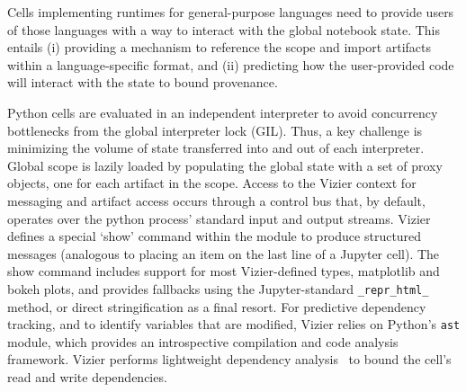 Cells implementing runtimes for general-purpose languages need to provide users of those languages with a way to interact with the global notebook state.
This entails (i) providing a mechanism to reference the scope and import artifacts within a language-specific format, and (ii) predicting how the user-provided code will interact with the state to bound provenance.

%
Python cells are evaluated in an independent interpreter to avoid concurrency bottlenecks from the global interpreter lock (GIL).
Thus, a key challenge is minimizing the volume of state transferred into and out of each interpreter.
Global scope is lazily loaded by populating the global state with a set of proxy objects, one for each artifact in the scope. %
%
%
Access to the Vizier context for messaging and artifact access occurs through a control bus that, by default, operates over the python process' standard input and output streams.
Vizier defines a special `show' command within the module to produce structured messages (analogous to placing an item on the last line of a Jupyter cell).
The show command includes support for most Vizier-defined types, matplotlib and bokeh plots, and provides fallbacks using the Jupyter-standard \texttt{\_repr\_html\_} method, or direct stringification as a final resort.
%
For predictive dependency tracking, and to identify variables that are modified, Vizier relies on Python's \texttt{ast} module, which provides an introspective compilation and code analysis framework.
Vizier performs lightweight dependency analysis~\cite{DG22} to bound the cell's read and write dependencies.


